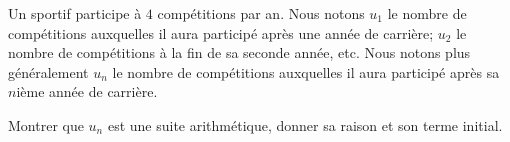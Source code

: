 
\begin{exercice}\label{exosmath-0166}

    Un sportif participe à \( 4\) compétitions par an. Nous notons \( u_1\) le nombre de compétitions auxquelles il aura participé après une année de carrière; \( u_2\) le nombre de compétitions à la fin de sa seconde année, etc. Nous notons plus généralement \( u_n\) le nombre de compétitions auxquelles il aura participé après sa \( n\)ième année de carrière.

    Montrer que \( u_n\) est une suite arithmétique, donner sa raison et son terme initial.

\end{exercice}
